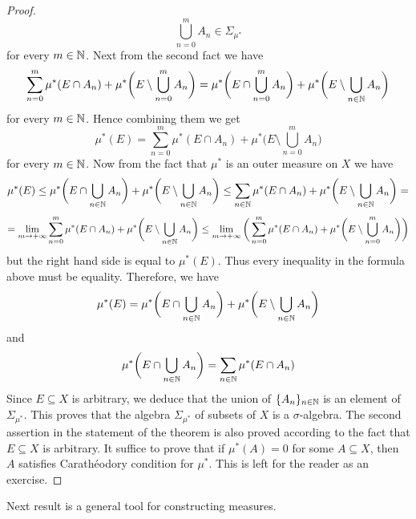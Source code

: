 \begin{proof}
    $$\bigcup_{n=0}^mA_n \in \Sigma_{\mu^*}$$
    for every $m\in {\mathbb N}$. Next from the second fact we have
    $$\sum_{n=0}^m\mu^*(E\cap A_n) + \mu^*\bigg(E\setminus \bigcup_{n=0}^mA_n\bigg) = \mu^*\bigg(E\cap \bigcup_{n=0}^mA_n\bigg) + \mu^*\bigg(E\setminus \bigcup_{n\in {\mathbb N}}A_n\bigg)$$
    for every $m\in {\mathbb N}$. Hence combining them we get
    $$\mu^*(E) = \sum_{n=0}^m\mu^*(E\cap A_n) + \mu^*\bigg(E\setminus \bigcup_{n=0}^mA_n\bigg)$$
    for every $m\in {\mathbb N}$. Now from the fact that $\mu^*$ is an outer measure on $X$ we have
    $$\mu^*(E) \leq \mu^*\bigg(E\cap \bigcup_{n\in {\mathbb N}}A_n\bigg) + \mu^*\bigg(E\setminus \bigcup_{n\in {\mathbb N}}A_n\bigg) \leq \sum_{n\in {\mathbb N}}\mu^*(E\cap A_n) + \mu^*\bigg(E\setminus \bigcup_{n\in {\mathbb N}}A_n\bigg) = $$
    $$= \lim_{m\rightarrow +\infty}\sum_{n=0}^m\mu^*(E\cap A_n) + \mu^*\bigg(E\setminus \bigcup_{n\in {\mathbb N}}A_n\bigg) \leq \lim_{m\rightarrow +\infty}\bigg(\sum_{n=0}^m\mu^*(E\cap A_n) + \mu^*\bigg(E\setminus \bigcup_{n=0}^mA_n\bigg)\bigg)$$
    but the right hand side is equal to $\mu^*(E)$. Thus every inequality in the formula above must be equality. Therefore, we have
    $$\mu^*(E) = \mu^*\bigg(E\cap \bigcup_{n\in {\mathbb N}}A_n\bigg) + \mu^*\bigg(E\setminus \bigcup_{n\in {\mathbb N}}A_n\bigg)$$
    and
    $$\mu^*\bigg(E\cap \bigcup_{n\in {\mathbb N}}A_n\bigg) = \sum_{n\in {\mathbb N}}\mu^*(E\cap A_n)$$
    Since $E\subseteq X$ is arbitrary, we deduce that the union of $\{A_n\}_{n\in {\mathbb N}}$ is an element of $\Sigma_{\mu^*}$. This proves that the algebra $\Sigma_{\mu^*}$ of subsets of $X$ is a $\sigma$-algebra. The second assertion in the statement of the theorem is also proved according to the fact that $E\subseteq X$ is arbitrary. It suffice to prove that if $\mu^*(A) = 0$ for some $A\subseteq X$, then $A$ satisfies Carath{\'e}odory condition for $\mu^*$. This is left for the reader as an exercise.
\end{proof}
\noindent
Next result is a general tool for constructing measures.

